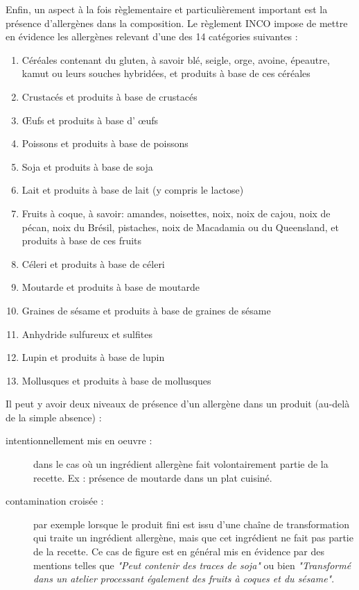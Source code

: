                Enfin, un aspect à la fois règlementaire et particulièrement important est la présence d'allergènes dans la composition.
                Le règlement INCO\cite{incotext}\cite{incoexpl} impose de mettre en évidence les allergènes relevant d'une des 14 catégories suivantes :
                \begin{enumerate}
                    \item Céréales contenant du gluten, à savoir blé, seigle, orge, avoine, épeautre, kamut ou leurs souches hybridées, et produits à base de ces céréales
                    \item Crustacés et produits à base de crustacés
                    \item \OE ufs et produits à base d’ \oe ufs
                    \item Poissons et produits à base de poissons
                    \item Soja et produits à base de soja
                    \item Lait et produits à base de lait (y compris le lactose)
                    \item Fruits à coque, à savoir: amandes, noisettes, noix, noix de cajou, noix de pécan, noix du Brésil, pistaches, noix de Macadamia ou du Queensland, et produits à base de ces fruits
                    \item Céleri et produits à base de céleri
                    \item Moutarde et produits à base de moutarde
                    \item Graines de sésame et produits à base de graines de sésame
                    \item Anhydride sulfureux et sulfites
                    \item Lupin et produits à base de lupin
                    \item Mollusques et produits à base de mollusques
                \end{enumerate}
                Il peut y avoir deux niveaux de présence d'un allergène dans un produit (au-delà de la simple absence) :
                \begin{description}
                    \item[intentionnellement mis en oeuvre :] dans le cas où un ingrédient allergène fait volontairement partie de la recette. Ex : présence de moutarde dans un plat cuisiné.
                    \item[contamination croisée :] par exemple lorsque le produit fini est issu d'une chaîne de transformation qui traite un ingrédient allergène, mais que cet ingrédient ne fait pas partie de la recette. Ce cas de figure est en général mis en évidence par des mentions telles que \emph{"Peut contenir des traces de soja"} ou bien \emph{"Transformé dans un atelier processant également des fruits à coques et du sésame"}.
                \end{description}

